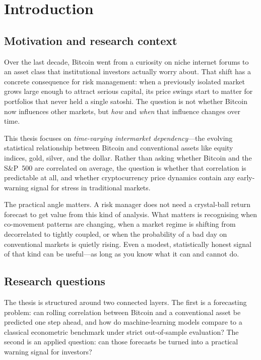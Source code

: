 \section{Introduction}

\subsection{Motivation and research context}

Over the last decade, Bitcoin went from a curiosity on niche internet forums to an asset class that institutional investors actually worry about. That shift has a concrete consequence for risk management: when a previously isolated market grows large enough to attract serious capital, its price swings start to matter for portfolios that never held a single satoshi. The question is not whether Bitcoin now influences other markets, but \emph{how} and \emph{when} that influence changes over time.

This thesis focuses on \emph{time-varying intermarket dependency}---the evolving statistical relationship between Bitcoin and conventional assets like equity indices, gold, silver, and the dollar. Rather than asking whether Bitcoin and the S\&P~500 are correlated on average, the question is whether that correlation is predictable at all, and whether cryptocurrency price dynamics contain any early-warning signal for stress in traditional markets.

The practical angle matters. A risk manager does not need a crystal-ball return forecast to get value from this kind of analysis. What matters is recognising when co-movement patterns are changing, when a market regime is shifting from decorrelated to tightly coupled, or when the probability of a bad day on conventional markets is quietly rising. Even a modest, statistically honest signal of that kind can be useful---as long as you know what it can and cannot do.

\subsection{Research questions}

The thesis is structured around two connected layers. The first is a forecasting problem: can rolling correlation between Bitcoin and a conventional asset be predicted one step ahead, and how do machine-learning models compare to a classical econometric benchmark under strict out-of-sample evaluation? The second is an applied question: can those forecasts be turned into a practical warning signal for investors?


